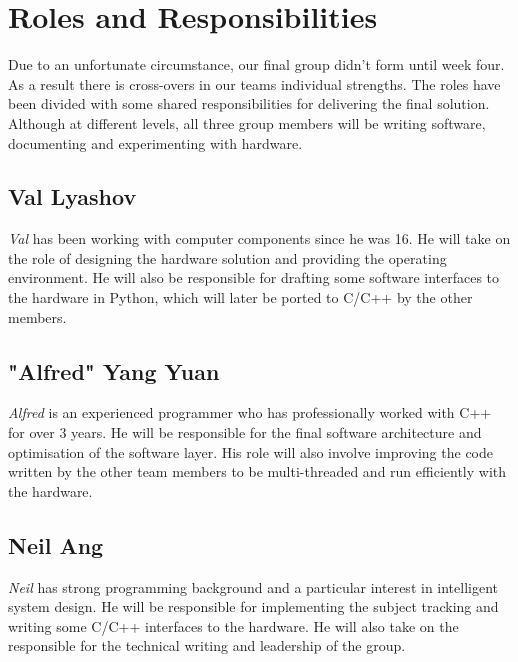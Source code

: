 \documentclass[11pt,a4paper,titlepage]{report}
\begin{document}
\section{Roles and Responsibilities}



Due to an unfortunate circumstance, our final group didn't form until week four. As a result there is cross-overs in our teams individual strengths. The roles have been divided with some shared responsibilities for delivering the final solution. Although at different levels, all three group members will be writing software, documenting and experimenting with hardware.


\subsection{Val Lyashov}
\textit{Val} has been working with computer components since he was 16. He will take on the role of designing the hardware solution and providing the operating environment. He will also be responsible for drafting some software interfaces to the hardware in Python, which will later be ported to C/C++ by the other members.


\subsection{"Alfred" Yang Yuan}
\textit{Alfred} is an experienced programmer who has professionally worked with C++ for over 3 years. He will be responsible for the final software architecture and optimisation of the software layer. His role will also involve improving the code written by the other team members to be multi-threaded and run efficiently with the hardware.

\subsection{Neil Ang}
\textit{Neil} has strong programming background and a particular interest in intelligent system design. He will be responsible for implementing the subject tracking and writing some C/C++ interfaces to the hardware. He will also take on the responsible for the technical writing and leadership of the group. 
\end{document}
